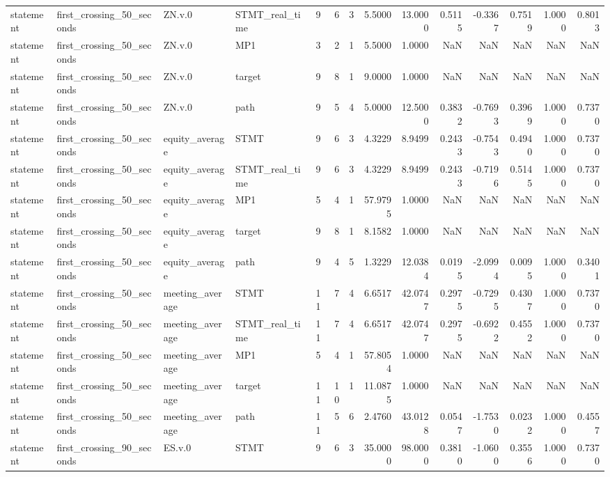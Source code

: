 \begin{tabular}{llllrrrrrrrrrr}
statement & first_crossing_50_seconds & ZN.v.0 & STMT_real_time & 9 & 6 & 3 & 5.5000 & 13.0000 & 0.5115 & -0.3367 & 0.7519 & 1.0000 & 0.8013 \\
statement & first_crossing_50_seconds & ZN.v.0 & MP1 & 3 & 2 & 1 & 5.5000 & 1.0000 & NaN & NaN & NaN & NaN & NaN \\
statement & first_crossing_50_seconds & ZN.v.0 & target & 9 & 8 & 1 & 9.0000 & 1.0000 & NaN & NaN & NaN & NaN & NaN \\
statement & first_crossing_50_seconds & ZN.v.0 & path & 9 & 5 & 4 & 5.0000 & 12.5000 & 0.3832 & -0.7693 & 0.3969 & 1.0000 & 0.7370 \\
statement & first_crossing_50_seconds & equity_average & STMT & 9 & 6 & 3 & 4.3229 & 8.9499 & 0.2433 & -0.7543 & 0.4940 & 1.0000 & 0.7370 \\
statement & first_crossing_50_seconds & equity_average & STMT_real_time & 9 & 6 & 3 & 4.3229 & 8.9499 & 0.2433 & -0.7196 & 0.5145 & 1.0000 & 0.7370 \\
statement & first_crossing_50_seconds & equity_average & MP1 & 5 & 4 & 1 & 57.9795 & 1.0000 & NaN & NaN & NaN & NaN & NaN \\
statement & first_crossing_50_seconds & equity_average & target & 9 & 8 & 1 & 8.1582 & 1.0000 & NaN & NaN & NaN & NaN & NaN \\
statement & first_crossing_50_seconds & equity_average & path & 9 & 4 & 5 & 1.3229 & 12.0384 & 0.0195 & -2.0994 & 0.0095 & 1.0000 & 0.3401 \\
statement & first_crossing_50_seconds & meeting_average & STMT & 11 & 7 & 4 & 6.6517 & 42.0747 & 0.2975 & -0.7295 & 0.4307 & 1.0000 & 0.7370 \\
statement & first_crossing_50_seconds & meeting_average & STMT_real_time & 11 & 7 & 4 & 6.6517 & 42.0747 & 0.2975 & -0.6922 & 0.4552 & 1.0000 & 0.7370 \\
statement & first_crossing_50_seconds & meeting_average & MP1 & 5 & 4 & 1 & 57.8054 & 1.0000 & NaN & NaN & NaN & NaN & NaN \\
statement & first_crossing_50_seconds & meeting_average & target & 11 & 10 & 1 & 11.0875 & 1.0000 & NaN & NaN & NaN & NaN & NaN \\
statement & first_crossing_50_seconds & meeting_average & path & 11 & 5 & 6 & 2.4760 & 43.0128 & 0.0547 & -1.7530 & 0.0232 & 1.0000 & 0.4557 \\
statement & first_crossing_90_seconds & ES.v.0 & STMT & 9 & 6 & 3 & 35.0000 & 98.0000 & 0.3810 & -1.0600 & 0.3556 & 1.0000 & 0.7370 \\

\end{tabular}
